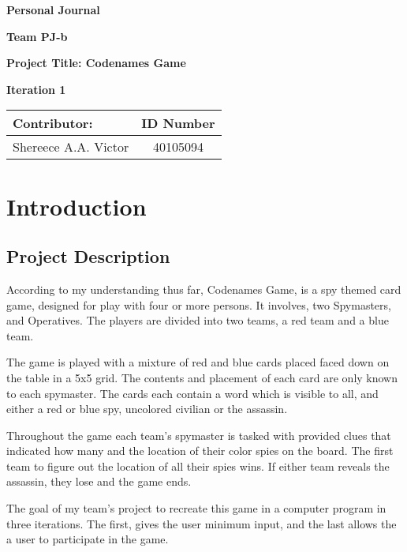 \documentclass[12pt]{article}
\begin{document}
\vspace*{0.5in}
\centerline{\bf\Large Personal Journal}
\vspace*{0.5in}
\centerline{\bf\Large Team PJ-b}
\vspace*{0.5in}
\centerline{\bf\Large Project Title: Codenames Game }
\vspace*{0.25in}
\centerline{\bf\Large Iteration 1}


\vspace*{2in}
\begin{table}[htbp]
\begin{center}
\begin{tabular}{|l | c|}
\hline
Contributor: & ID Number \\
\hline
Shereece A.A. Victor  & 40105094  \\
\hline
\end{tabular}
\end{center}
\end{table}

\clearpage
\section{Introduction}

\subsection{Project Description}
According to my understanding thus far, Codenames Game, is a spy themed card game, designed for play with four or more persons. It involves, two Spymasters, and Operatives. The players are divided into two teams, a red team and a blue team. 

The game is played with a mixture of red and blue cards placed faced down on the table in a 5x5 grid. The contents and placement of each card are only known to each spymaster. The cards each contain a word which is visible to all, and either a red or blue spy, uncolored civilian or the assassin. 

Throughout the game each team’s spymaster is tasked with provided clues that indicated how many and the location of their color spies on the board. The first team to figure out the location of all their spies wins. If either team reveals the assassin, they lose and the game ends. 

The goal of my team’s project to recreate this game in a computer program in three iterations. The first, gives the user minimum input, and the last allows the a user to participate in the game. 
\end{document}
